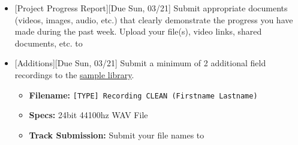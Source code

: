 \def\dMon{Mon, 03/15}
\def\dTues{Tues, 03/16}
\def\dWed{Wed, 03/17}
\def\dThur{Thur, 03/18}
\def\dFri{Fri, 03/19}
\def\dSat{Sat, 03/20}
\def\dSun{Sun, 03/21}
\placeDate

\begin{itemize}[noitemsep,topsep=0pt,leftmargin=*]
    \item {}[Project Progress Report][Due \dSun] \newline
          Submit appropriate documents (videos, images, audio, etc.) that clearly demonstrate the progress you have made during the past week. Upload your file(s), video links, shared documents, etc. to \discordE
    \item {}[Additions][Due \dSun] \newline
          Submit a minimum of 2 additional field recordings to the \href{\samplelibPermURL}{sample library}.
          \begin{itemize}
              \item \textbf{Filename:} \texttt{[TYPE] Recording CLEAN (Firstname Lastname)}
              \item \textbf{Specs:} 24bit 44100hz WAV File
              \item \textbf{Track Submission:} Submit your file names to \discordS
          \end{itemize}
\end{itemize}